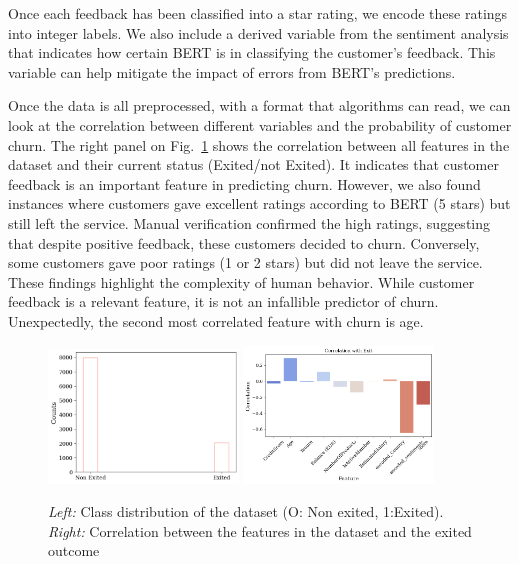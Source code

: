 \documentclass[12pt]{article}
\begin{document}
Once each feedback has been classified into a star rating, we encode these ratings into integer labels. We also include a derived variable from the sentiment analysis that indicates how certain \textsc{BERT} is in classifying the customer's feedback. This variable can help mitigate the impact of errors from \textsc{BERT}'s predictions.

Once the data is all preprocessed, with a format that algorithms can read, we can look at the correlation between different variables and the probability of customer churn. The right panel on Fig.~\ref{fig:class_distribution} shows the correlation between all features in the dataset and their current status (Exited/not Exited). It indicates that customer feedback is an important feature in predicting churn. However, we also found instances where customers gave excellent ratings according to \textsc{BERT} (5 stars) but still left the service. Manual verification confirmed the high ratings, suggesting that despite positive feedback, these customers decided to churn. Conversely, some customers gave poor ratings (1 or 2 stars) but did not leave the service. These findings highlight the complexity of human behavior. While customer feedback is a relevant feature, it is not an infallible predictor of churn. Unexpectedly, the second most correlated feature with churn is age. 

\begin{figure}[h!]
    \centering
    \includegraphics[width=0.45\textwidth]{figures/class_distribution.png}
    \includegraphics[width=0.45\textwidth]{figures/correlation_matrix.png}
    \caption{\emph{Left:} Class distribution of the dataset (O: Non exited, 1:Exited). \emph{Right:} Correlation between the features in the dataset and the exited outcome}
    \label{fig:class_distribution}
\end{figure}
\end{document}
